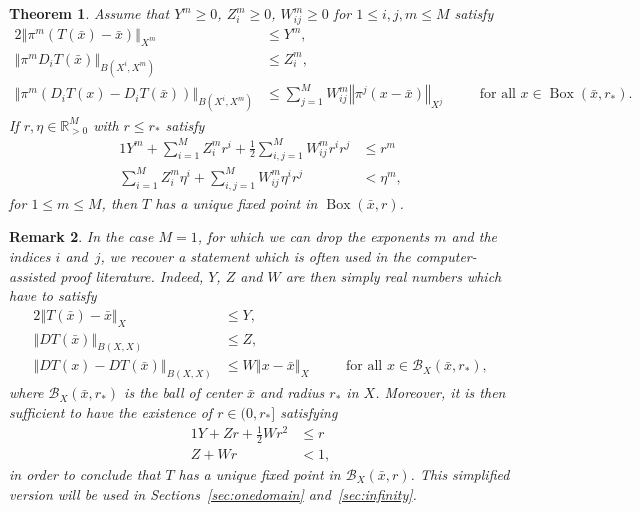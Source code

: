 \documentclass[10pt,a4paper]{article}
\theoremstyle{plain}
\newtheorem{theorem}{Theorem}[section]
\newtheorem{remark}[theorem]{Remark}
\newcommand{\RR}{\mathbb R}
\newcommand{\B}{\mathcal{B}}
\renewcommand{\B}{\mathcal{B}}
\newcommand{\1}{\mathbf{1}}
\newcommand{\rstar}{r_*}
\DeclareMathOperator{\bbox}{Box}
\begin{document}
\begin{theorem}
\label{thm:NewtonKantorovich}
Assume that $Y^m \geq 0$, $Z^m_i \geq 0$, $W^m_{ij} \geq 0$ for $1 \leq  i,j,m \leq M$ satisfy
\begin{alignat}{2}
	\left\Vert\pi^m (T(\bar{x})-\bar{x}) \right\Vert_{X^m} &\leq Y^m, \label{e:def_Y}\\
	\left\Vert\pi^m D_i T(\bar{x}) \right\Vert_{B(X^i,X^m)} &\leq Z^m_i, \label{e:def_Z}\\
	\left\Vert\pi^m (D_i T(x)- D_i T(\bar{x})) \right\Vert_{B(X^i,X^m)} &\leq \sum_{j=1}^M W^m_{ij} \left\Vert \pi^j(x-\bar{x}) \right\Vert_{X^j}
	&\quad&\text{for all } x\in \bbox(\bar{x},\rstar). \label{e:def_W}
\end{alignat}
If $r,\eta \in \RR_{>0}^M$ with $r \leq \rstar$ satisfy
\begin{alignat}{1}
	Y^m + \sum_{i=1}^M Z^m_{i} r^i  
	+ \frac{1}{2}\sum_{i,j=1}^M W^m_{ij} r^i r^j  & \leq r^m 
	\label{e:inequalities1} \\
	 \sum_{i=1}^M Z^m_{i} \eta^i
	 + \sum_{i,j=1}^M W^m_{ij} \eta^i r^j  & < \eta^m,
	 \label{e:inequalities2} 
\end{alignat}
%
for $1\leq m\leq M$,
then $T$ has a unique fixed point in $\bbox(\bar{x},r)$.
\end{theorem}
%
\begin{remark}
In the case $M=1$, for which we can drop the exponents $m$ and the indices $i$ and~$j$, we recover a statement which is often used in the computer-assisted proof literature. Indeed, $Y$, $Z$ and $W$ are then simply real numbers which have to satisfy
 \begin{alignat}{2}
	\left\Vert T(\bar{x})-\bar{x} \right\Vert_{X} &\leq Y, \label{e:def_Y_M1}\\
	\left\Vert D T(\bar{x}) \right\Vert_{B(X,X)} &\leq Z, \label{e:def_Z_M1}\\
	\left\Vert D T(x)- D T(\bar{x}) \right\Vert_{B(X,X)} &\leq  W \left\Vert x-\bar{x} \right\Vert_{X}
	&\quad&\text{for all } x\in \B_X(\bar{x},\rstar), \label{e:def_W_M1}
\end{alignat}
where $\B_X(\bar{x},\rstar)$ is the ball of center $\bar{x}$ and radius $\rstar$ in $X$. Moreover, it is then sufficient to have the existence of $r\in(0,\rstar]$ satisfying 
\begin{alignat}{1}
	Y + Z r	+ \frac{1}{2}W r^2  & \leq r \label{e:inequalities1_M1}
	\\
	 Z + W r  & < 1,\label{e:inequalities2_M1}
\end{alignat}
in order to conclude that $T$ has a unique fixed point in $\B_X(\bar{x},r)$. This simplified version will be used in Sections~\ref{sec:onedomain} and~\ref{sec:infinity}.
\end{remark}
\end{document}
